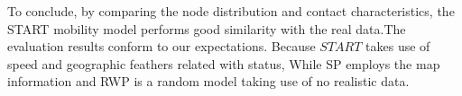 To conclude, by comparing the node distribution and contact characteristics, the START mobility model performs good similarity with the real data.The evaluation results conform to our expectations. Because $START$ takes use of speed and geographic feathers related with status, While SP employs the map information and RWP is a random model taking use of no realistic data.

